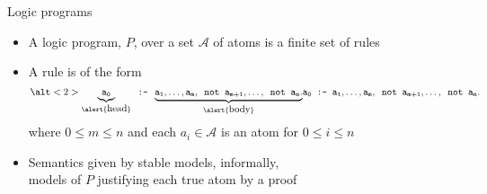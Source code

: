 \begin{frame}{Logic programs}
  \label{eqn:rule}
  \begin{itemize}
  \item <1->
    A \alert{logic program}, $P$, over a set $\mathcal{A}$ of atoms is a finite \alert{set} of rules
    \medskip
  \item <1->
    A \alert{rule} is of the form
    \[
      \alt<2>{\underbrace{\tt a_0}_{\alert{\text{\normalsize head}}} \texttt{ :- } \underbrace{\tt a_1,\dots,a_m,\texttt{ not }{a_{m+1}},\dots,\texttt{ not }{a_n}.}_{\alert{\text{\normalsize body}}}}
             {\tt            a_0                               \texttt{ :- }                  a_1,\dots,a_m,\texttt{ not }{a_{m+1}},\dots,\texttt{ not }{a_n}.}
    \]
    where $0\leq m\leq n$ and each $a_i\in{\mathcal{A}}$ is an \alert{atom} for $0\leq i\leq n$
    \bigskip
  \item <only@4->
    Semantics given by \alert{stable models}, informally,\\
    models of $P$ justifying each true atom by a proof
  \end{itemize}
\end{frame}
%
